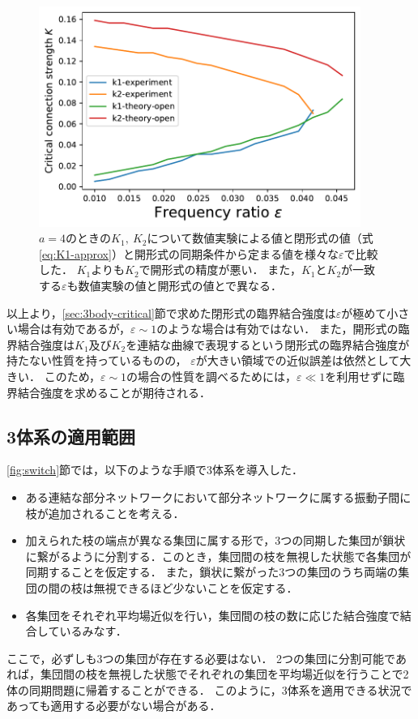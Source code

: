 \documentclass[../main]{subfiles}
\begin{document}
\begin{figure}[tbp]
\centering
\includegraphics[width=105mm]{./images/k1k2-compare-open.pdf}
\centering
\caption{$a=4$のときの$K_1,\ K_2$について数値実験による値と閉形式の値（式\eqref{eq:K1-approx}）と開形式の同期条件から定まる値を様々な$\varepsilon$で比較した．
$K_1$よりも$K_2$で開形式の精度が悪い．
また，$K_1$と$K_2$が一致する$\varepsilon$も数値実験の値と開形式の値とで異なる．}
\label{fig:k1k2-compare}
\end{figure}

以上より，\ref{sec:3body-critical}節で求めた閉形式の臨界結合強度は$\varepsilon$が極めて小さい場合は有効であるが，$\varepsilon\sim 1$のような場合は有効ではない．
また，開形式の臨界結合強度は$K_1$及び$K_2$を連結な曲線で表現するという閉形式の臨界結合強度が持たない性質を持っているものの，
$\varepsilon$が大きい領域での近似誤差は依然として大きい．
このため，$\varepsilon\sim 1$の場合の性質を調べるためには，$\varepsilon\ll 1$を利用せずに臨界結合強度を求めることが期待される．

\subsection{3体系の適用範囲}
\ref{fig:switch}節では，以下のような手順で3体系を導入した．
\begin{itemize}
    \item ある連結な部分ネットワークにおいて部分ネットワークに属する振動子間に枝が追加されることを考える．
    \item 加えられた枝の端点が異なる集団に属する形で，3つの同期した集団が鎖状に繋がるように分割する．このとき，集団間の枝を無視した状態で各集団が同期することを仮定する．
    また，鎖状に繋がった3つの集団のうち両端の集団の間の枝は無視できるほど少ないことを仮定する．
    \item 各集団をそれぞれ平均場近似を行い，集団間の枝の数に応じた結合強度で結合しているみなす．
\end{itemize}
ここで，必ずしも3つの集団が存在する必要はない．
2つの集団に分割可能であれば，集団間の枝を無視した状態でそれぞれの集団を平均場近似を行うことで2体の同期問題に帰着することができる．
このように，3体系を適用できる状況であっても適用する必要がない場合がある．
\end{document}
